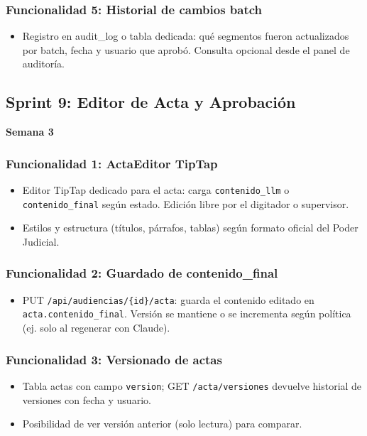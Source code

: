 \documentclass[12pt,a4paper]{report}
\begin{document}
\subsubsection{Funcionalidad 5: Historial de cambios batch}

\begin{itemize}
    \item Registro en audit\_log o tabla dedicada: qué segmentos fueron actualizados por batch, fecha y usuario que aprobó. Consulta opcional desde el panel de auditoría.
\end{itemize}

\subsection{Sprint 9: Editor de Acta y Aprobación}

\textbf{Semana 3}

\subsubsection{Funcionalidad 1: ActaEditor TipTap}

\begin{itemize}
    \item Editor TipTap dedicado para el acta: carga \texttt{contenido\_llm} o \texttt{contenido\_final} según estado. Edición libre por el digitador o supervisor.
    \item Estilos y estructura (títulos, párrafos, tablas) según formato oficial del Poder Judicial.
\end{itemize}

\subsubsection{Funcionalidad 2: Guardado de contenido\_final}

\begin{itemize}
    \item PUT \texttt{/api/audiencias/\{id\}/acta}: guarda el contenido editado en \texttt{acta.contenido\_final}. Versión se mantiene o se incrementa según política (ej. solo al regenerar con Claude).
\end{itemize}

\subsubsection{Funcionalidad 3: Versionado de actas}

\begin{itemize}
    \item Tabla actas con campo \texttt{version}; GET \texttt{/acta/versiones} devuelve historial de versiones con fecha y usuario.
    \item Posibilidad de ver versión anterior (solo lectura) para comparar.
\end{itemize}
\end{document}
